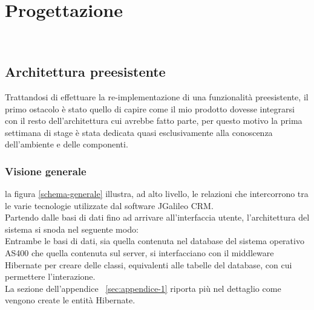 
\chapter{Progettazione}
\label{cap:progettazione}

\\ %

\section{Architettura preesistente}
Trattandosi di effettuare la re-implementazione di una funzionalità preesistente, il primo ostacolo è stato quello di capire come il mio prodotto dovesse integrarsi con il resto dell'architettura cui avrebbe fatto parte, per questo motivo la prima settimana di stage è stata dedicata quasi esclusivamente alla conoscenza dell'ambiente e delle componenti. \\

\subsection{Visione generale}


la figura \ref{schema-generale} illustra, ad alto livello, le relazioni che intercorrono tra le varie tecnologie utilizzate dal software JGalileo CRM.\\
Partendo dalle basi di dati fino ad arrivare all'interfaccia utente, l'architettura del sistema si snoda nel seguente modo:\\
Entrambe le basi di dati, sia quella contenuta nel database del sistema operativo AS400 che quella contenuta sul server, si interfacciano con il \gls{middleware} Hibernate per creare delle classi, equivalenti alle tabelle del database, con cui permettere l'interazione.\\ 
La sezione dell'appendice ~\ref{sec:appendice-1} riporta più nel dettaglio come vengono create le entità Hibernate.\\

